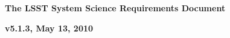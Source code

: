 \documentclass[11pt,letterpaper]{article}
\newcommand{\B}[1]{}
\newcommand{\R}[1]{#1}
\newcommand{\G}[1]{#1}
\begin{document}

\centerline{\Large\bf The LSST System Science Requirements Document}
\centerline{\large\bf v5.1.3, May 13, 2010}













\newpage
\printglossary
\end{document}
